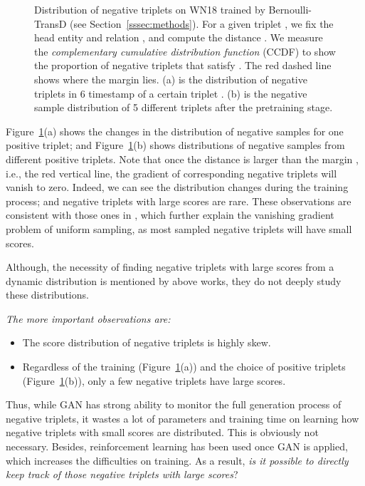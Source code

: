 \documentclass[conference]{IEEEtran}
\begin{document}
\begin{figure}[ht]
	\centering
	

	\caption{Distribution of negative triplets on WN18 trained by Bernoulli-TransD
		(see Section~\ref{sssec:methods}). 
		For a given triplet , we fix the head entity  and relation , and compute the distance .  
		We measure the \emph{complementary cumulative distribution function} (CCDF)  to show the proportion of negative triplets that satisfy  . 
		The red dashed line shows where the margin  lies. 
		(a) is the distribution of negative triplets in 6 timestamp of a certain triplet . (b) is the negative sample distribution of 5 different triplets  after the pretraining stage.}
	\label{fig-distance}
\end{figure}

Figure~\ref{fig-distance}(a) shows the changes in the distribution of negative samples
for one positive triplet;
and Figure~\ref{fig-distance}(b)
shows distributions of negative samples from different positive triplets.
Note that once the distance is larger than the margin ,
i.e.,
the red vertical line,
the gradient of corresponding negative triplets will vanish to zero.
Indeed, we can see
the distribution changes during the training process; and
negative triplets with large scores are rare.
These observations are consistent with those ones in
\cite{wang2018incorporating,cai2018kbgan},
which further explain the vanishing gradient problem of uniform sampling,
as most sampled negative triplets will have small scores.



Although, 
the necessity of finding negative triplets with large scores from a dynamic distribution
is mentioned by above works,
they do not deeply study these distributions.
{\it
\noindent
{}
The more important observations are:
\begin{itemize}
\item The score distribution of negative triplets  is highly skew.
	
	\item Regardless of the training (Figure~\ref{fig-distance}(a)) and the choice of positive triplets (Figure~\ref{fig-distance}(b)),
	only a few negative triplets have large scores.
\end{itemize}}
Thus,
while GAN has strong ability to monitor the full generation process of negative triplets,
it wastes a lot of parameters and training time on learning
how negative triplets with small scores are distributed.
This is obviously not necessary. 
Besides,
reinforcement learning has been used once GAN is applied,
which increases the difficulties on training.
As a result,
\textit{is it possible to directly keep track of those negative triplets with large scores}?
\end{document}
